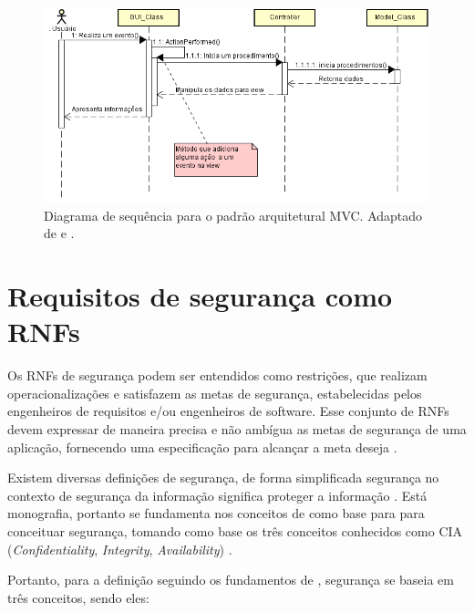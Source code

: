 \begin{figure}[h!]
	\centering
	\includegraphics[keepaspectratio=true,scale=0.8]{figuras/DiagramaDeSequenciaMVC.PNG}
	\caption{Diagrama de sequência para o padrão arquitetural MVC. Adaptado de \cite{durelli2008proposta} e \cite{buschmann1996system}.}
	\label{DiagramaDeSequenciaMVC}
\end{figure}

\pagebreak

\section{Requisitos de segurança como RNFs}
\label{sec:seguranca}

Os RNFs de segurança podem ser entendidos como restrições, que realizam operacionalizações e satisfazem as metas de segurança, estabelecidas pelos engenheiros de requisitos e/ou engenheiros de software. Esse conjunto de  RNFs devem expressar de maneira precisa e não ambígua as metas de segurança de uma aplicação, fornecendo uma especificação para alcançar a meta deseja \cite{haley2006framework}.  

Existem diversas definições de segurança, de forma simplificada segurança no contexto de segurança da informação significa proteger a informação \cite{chung2012non}. Está monografia, portanto se fundamenta nos conceitos de \cite{chung2012non} \cite{sullivan2011web} como base para para conceituar segurança, tomando como base os três conceitos conhecidos como CIA (\textit{Confidentiality}, \textit{Integrity}, \textit{Availability}) . 

Portanto, para a definição seguindo os fundamentos de \cite{chung2012non}, segurança se baseia em três conceitos, sendo eles: 

